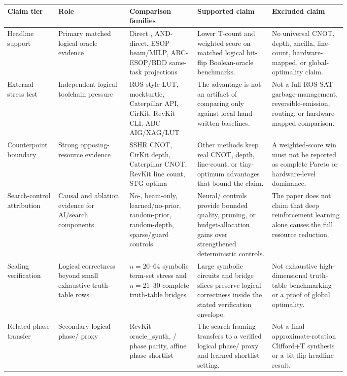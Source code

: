 \begin{tabularx}{\linewidth}{>{\raggedright\arraybackslash}p{0.15\linewidth}>{\raggedright\arraybackslash}p{0.21\linewidth}>{\raggedright\arraybackslash}X>{\raggedright\arraybackslash}p{0.22\linewidth}>{\raggedright\arraybackslash}p{0.22\linewidth}}
\toprule
Claim tier & Role & Comparison families & Supported claim & Excluded claim \\
\midrule
Headline support & Primary matched logical-oracle evidence & Direct \anf{}, AND-direct, ESOP beam/MILP, ABC-ESOP/BDD same-task projections & Lower T-count and weighted score on matched logical bit-flip Boolean-oracle benchmarks. & No universal CNOT, depth, ancilla, line-count, hardware-mapped, or global-optimality claim. \\
External stress test & Independent logical-toolchain pressure & ROS-style LUT, mockturtle, Caterpillar API, CirKit, RevKit CLI, ABC AIG/XAG/LUT & The advantage is not an artifact of comparing only against local hand-written baselines. & Not a full ROS SAT garbage-management, reversible-emission, routing, or hardware-mapped comparison. \\
Counterpoint boundary & Strong opposing-resource evidence & SSHR CNOT, CirKit depth, Caterpillar CNOT, RevKit line count, STG optima & Other methods keep real CNOT, depth, line-count, or tiny-optimum advantages that bound the claim. & A weighted-score win must not be reported as complete Pareto or hardware-level dominance. \\
Search-control attribution & Causal and ablation evidence for AI/search components & No-\mcts{}, beam-only, learned/no-prior, random-prior, random-depth, sparse/guard controls & Neural/\mcts{} controls provide bounded quality, pruning, or budget-allocation gains over strengthened deterministic controls. & The paper does not claim that deep reinforcement learning alone causes the full resource reduction. \\
Scaling verification & Logical correctness beyond small exhaustive truth-table rows & $n=20$--$64$ symbolic term-set stress and $n=21$--$30$ complete truth-table bridges & Large symbolic circuits and bridge slices preserve logical correctness inside the stated verification envelope. & Not exhaustive high-dimensional truth-table benchmarking or a proof of global optimality. \\
Related phase transfer & Secondary logical phase/\rz{} proxy & RevKit oracle\_synth, \anf{}/\fprm{} phase parity, affine phase shortlist & The search framing transfers to a verified logical phase/\rz{} proxy and learned shortlist setting. & Not a final approximate-rotation Clifford+T synthesis or a bit-flip headline result. \\
\bottomrule
\end{tabularx}
